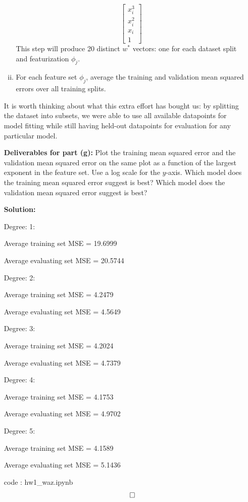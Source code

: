 \documentclass{article}
\newenvironment{solution}{\color{blue} \smallskip \textbf{Solution:}}{}
\begin{document}
\begin{enumerate}[(a)]
\begin{enumerate}[(i)]
\[\begin{bmatrix}
                x_i^3 \\
                x_i^2 \\
                x_i \\
                1
            \end{bmatrix}
        \]
        This step will produce 20 distinct $w^*$ vectors: one for each dataset split and featurization $\phi_j$.        
        \item 
        For each feature set $\phi_j$, average the training and validation mean squared errors over all training splits.
    \end{enumerate}
    It is worth thinking about what this extra effort has bought us: by splitting the dataset into subsets, we were able to use all available datapoints for model fitting while still having held-out datapoints for evaluation for any particular model.

    \textbf{Deliverables for part (g):} Plot the training mean squared error and the validation mean squared error on the same plot as a function of the largest exponent in the feature set. 
    Use a log scale for the $y$-axis.
    Which model does the training mean squared error suggest is best? 
    Which model does the validation mean squared error suggest is best?

    \begin{solution}

        Degree: 1:

        Average training set MSE = 19.6999

        Average evaluating set MSE = 20.5744



        Degree: 2:

        Average training set MSE = 4.2479

        Average evaluating set MSE = 4.5649



        Degree: 3:

        Average training set MSE = 4.2024

        Average evaluating set MSE = 4.7379



        Degree: 4:

        Average training set MSE = 4.1753

        Average evaluating set MSE = 4.9702



        Degree: 5:

        Average training set MSE = 4.1589

        Average evaluating set MSE = 5.1436


        code : hw1\_waz.ipynb
        \[ \qedhere \]
    \end{solution}
    
\end{enumerate}
\end{document}
